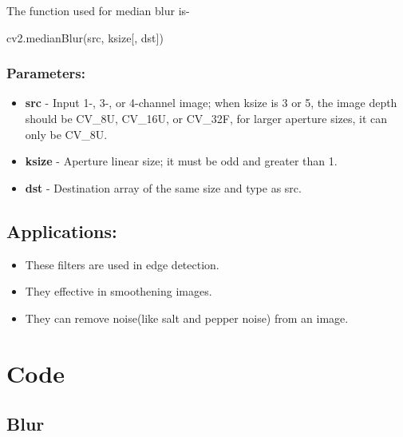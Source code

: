 \documentclass[]{article}
\newenvironment{Shaded}{}{}
\newcommand{\NormalTok}[1]{{#1}}
\providecommand{\tightlist}{%
  \setlength{\itemsep}{0pt}\setlength{\parskip}{0pt}}
\begin{document}
The function used for median blur is-

\begin{Shaded}
\begin{Highlighting}[]
\NormalTok{cv2.medianBlur(src, ksize[, dst])}
\end{Highlighting}
\end{Shaded}

\subsubsection{Parameters:}\label{parameters-1}

\begin{itemize}
\tightlist
\item
  \textbf{src} - Input 1-, 3-, or 4-channel image; when ksize is 3 or 5,
  the image depth should be CV\_8U, CV\_16U, or CV\_32F, for larger
  aperture sizes, it can only be CV\_8U.
\item
  \textbf{ksize} - Aperture linear size; it must be odd and greater than
  1.
\item
  \textbf{dst} - Destination array of the same size and type as src.
\end{itemize}

\subsection{Applications:}\label{applications}

\begin{itemize}
\tightlist
\item
  These filters are used in edge detection.\\
\item
  They effective in smoothening images.
\item
  They can remove noise(like salt and pepper noise) from an image.
\end{itemize}

\section{Code}\label{code}

\subsection{Blur}\label{blur-1}
\end{document}
